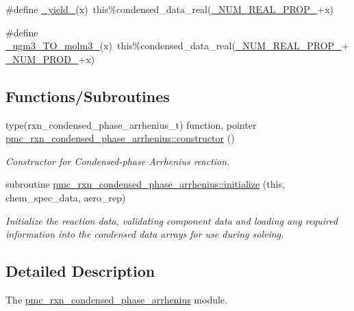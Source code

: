 \begin{DoxyCompactItemize}
\item 
\#define \mbox{\hyperlink{rxn__condensed__phase__arrhenius_8_f90_a767b378bc7f42ea6f251cd44b8bc09da}{\+\_\+yield\+\_\+}}(x)~this\%condensed\+\_\+data\+\_\+real(\mbox{\hyperlink{sub__model___u_n_i_f_a_c_8_f90_a242fac7fe42c0d62936c65735dc023a6}{\+\_\+\+N\+U\+M\+\_\+\+R\+E\+A\+L\+\_\+\+P\+R\+O\+P\+\_\+}}+x)
\item 
\#define \mbox{\hyperlink{rxn__condensed__phase__arrhenius_8_f90_a771a27813d3d57b8dd3b11526d03798b}{\+\_\+ugm3\+\_\+\+T\+O\+\_\+molm3\+\_\+}}(x)~this\%condensed\+\_\+data\+\_\+real(\mbox{\hyperlink{sub__model___u_n_i_f_a_c_8_f90_a242fac7fe42c0d62936c65735dc023a6}{\+\_\+\+N\+U\+M\+\_\+\+R\+E\+A\+L\+\_\+\+P\+R\+O\+P\+\_\+}}+\mbox{\hyperlink{rxn__troe_8_f90_a0ab2d7e00e334b5c52335f26ef6025e8}{\+\_\+\+N\+U\+M\+\_\+\+P\+R\+O\+D\+\_\+}}+x)
\end{DoxyCompactItemize}
\subsection*{Functions/\+Subroutines}
\begin{DoxyCompactItemize}
\item 
type(rxn\+\_\+condensed\+\_\+phase\+\_\+arrhenius\+\_\+t) function, pointer \mbox{\hyperlink{namespacepmc__rxn__condensed__phase__arrhenius_a86fca966cbac239128e1c8182d9435ac}{pmc\+\_\+rxn\+\_\+condensed\+\_\+phase\+\_\+arrhenius\+::constructor}} ()
\begin{DoxyCompactList}\small\item\em Constructor for Condensed-\/phase Arrhenius reaction. \end{DoxyCompactList}\item 
subroutine \mbox{\hyperlink{namespacepmc__rxn__condensed__phase__arrhenius_a8a116287a43f4018bb5896f88b55d0d6}{pmc\+\_\+rxn\+\_\+condensed\+\_\+phase\+\_\+arrhenius\+::initialize}} (this, chem\+\_\+spec\+\_\+data, aero\+\_\+rep)
\begin{DoxyCompactList}\small\item\em Initialize the reaction data, validating component data and loading any required information into the condensed data arrays for use during solving. \end{DoxyCompactList}\end{DoxyCompactItemize}


\subsection{Detailed Description}
The \mbox{\hyperlink{namespacepmc__rxn__condensed__phase__arrhenius}{pmc\+\_\+rxn\+\_\+condensed\+\_\+phase\+\_\+arrhenius}} module. 




